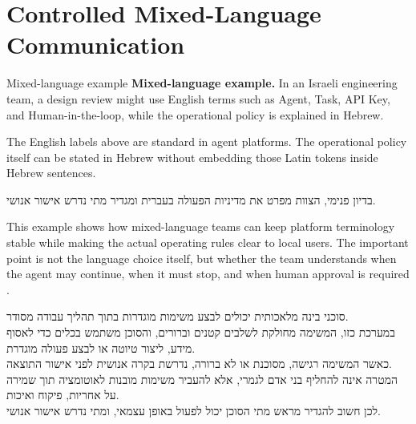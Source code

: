 \section{Controlled Mixed-Language Communication}
\label{sec:bidi-mixed}

\begin{insightbox}{Mixed-language example}
\textbf{Mixed-language example.} In an Israeli engineering team, a design review might use
English terms such as Agent, Task, API Key, and Human-in-the-loop, while the operational
policy is explained in Hebrew.
\end{insightbox}

\noindent
The English labels above are standard in agent platforms. The operational policy itself can
be stated in Hebrew without embedding those Latin tokens inside Hebrew sentences.

\vspace{0.35em}
\begin{hebrew}
\begin{flushright}
בדיון פנימי, הצוות מפרט את מדיניות הפעולה בעברית ומגדיר מתי נדרש אישור אנושי.
\end{flushright}
\end{hebrew}

This example shows how mixed-language teams can keep platform terminology stable while
making the actual operating rules clear to local users. The important point is not the
language choice itself, but whether the team understands when the agent may continue, when
it must stop, and when human approval is required \cite{redditcomplextasks,mediumworkflowagents}.

\label{sec:bidi-hebrew-summary}

\begin{tcolorbox}[colback=boxBg,colframe=boxFrame,title={\texthebrew{סיכום בעברית}},sharp corners,halign title=flush right]
\begin{hebrew}
\begin{flushright}
סוכני בינה מלאכותית יכולים לבצע משימות מוגדרות בתוך תהליך עבודה מסודר.\\[0.45em]
במערכת כזו, המשימה מחולקת לשלבים קטנים וברורים, והסוכן משתמש בכלים כדי לאסוף מידע, ליצור טיוטה או לבצע פעולה מוגדרת.\\[0.45em]
כאשר המשימה רגישה, מסוכנת או לא ברורה, נדרשת בקרה אנושית לפני אישור התוצאה.\\[0.45em]
המטרה אינה להחליף בני אדם לגמרי, אלא להעביר משימות מובנות לאוטומציה תוך שמירה על אחריות, פיקוח ואיכות.\\[0.45em]
לכן חשוב להגדיר מראש מתי הסוכן יכול לפעול באופן עצמאי, ומתי נדרש אישור אנושי.
\end{flushright}
\end{hebrew}
\end{tcolorbox}

